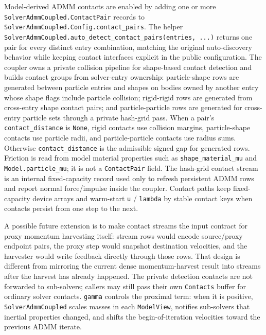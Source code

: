 \documentclass[11pt]{article}
\begin{document}
Model-derived ADMM contacts are enabled by adding one or more
\texttt{SolverAdmmCoupled.ContactPair} records to
\texttt{SolverAdmmCoupled.Config.contact\_pairs}. The helper
\texttt{SolverAdmmCoupled.auto\_detect\_contact\_pairs(entries, ...)} returns
one pair for every distinct entry combination, matching the original
auto-discovery behavior while keeping contact interfaces explicit in the public
configuration. The coupler owns a private collision pipeline for shape-based
contact detection and builds contact groups from solver-entry ownership:
particle-shape rows are generated between particle entries and shapes on bodies
owned by another entry whose shape flags include particle collision;
rigid-rigid rows are generated from cross-entry shape contact pairs; and
particle-particle rows are generated for cross-entry particle sets through a
private hash-grid pass. When a pair's \texttt{contact\_distance} is
\texttt{None}, rigid contacts use collision margins, particle-shape contacts
use particle radii, and particle-particle contacts use radius sums. Otherwise
\texttt{contact\_distance} is the admissible signed gap for generated rows.
Friction is read from model material properties such as
\texttt{shape\_material\_mu} and \texttt{Model.particle\_mu}; it is not a
\texttt{ContactPair} field. The hash-grid contact stream is an internal
fixed-capacity record used only to refresh persistent ADMM rows and report
normal force/impulse inside the coupler. Contact paths keep fixed-capacity
device arrays and warm-start \texttt{u} / \texttt{lambda} by stable contact keys
when contacts persist from one step to the next.

A possible future extension is to make contact streams the input contract for
proxy momentum harvesting itself: stream rows would encode source/proxy endpoint
pairs, the proxy step would snapshot destination velocities, and the harvester
would write feedback directly through those rows. That design is different from
mirroring the current dense momentum-harvest result into streams after the
harvest has already happened. The private detection contacts are not forwarded
to sub-solvers; callers may still pass their own \texttt{Contacts} buffer for
ordinary solver contacts. \texttt{gamma} controls the proximal term: when it is
positive, \texttt{SolverAdmmCoupled} scales masses in each \texttt{ModelView},
notifies sub-solvers that inertial properties changed, and shifts the
begin-of-iteration velocities toward the previous ADMM iterate.
\end{document}
